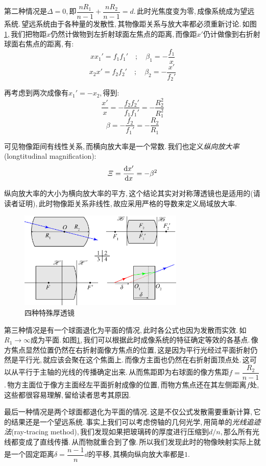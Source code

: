 第二种情况是\(\varDelta=0\),\,即\(\dfrac{nR_1}{n-1}+\dfrac{nR_2}{n-1}=d\).\,此时光焦度变为零,\,成像系统成为望远系统.\,望远系统由于各种量的发散性,\,其物像距关系与放大率都必须重新讨论.\,如图\ref{fig5-7-12},\,我们把物距\(x\)仍然计做物到左折射球面左焦点的距离,\,而像距\(x'\)仍计做像到右折射球面右焦点的距离,\,有:
\[xx_1'=f_1f_1'\quad ;\quad \beta_1=-\frac{f_1}{x}\]
\[x_2x'=f_2f_2'\quad ;\quad \beta_2=-\frac{x'}{f_2'}\]

再考虑到两次成像有\(x_1'=-x_2\),\,得到:
\[\frac{x'}{x}=-\frac{f_2f_2'}{f_1f_1'}=-\frac{R_2^2}{R_1^2}\]
\[\beta=-\frac{f_2}{f_1'}=-\frac{R_2}{R_1}\]

可见物像距间有线性关系,\,而横向放大率是一个常数.\,我们也定义\emph{纵向放大率}(longtitudinal magnification):
\[\varXi=\frac{\textrm{d} x'}{\textrm{d} x}=-\beta^2\]

纵向放大率的大小为横向放大率的平方,\,这个结论其实对对称薄透镜也是适用的(请读者证明),\,此时物像距关系非线性,\,故应采用严格的导数来定义局域放大率.

\begin{figure}[H]
\centering
\includegraphics[width=0.7\textwidth]{image/5-7-12.png}
\caption{四种特殊厚透镜}
\label{fig5-7-12}
\end{figure}

第三种情况是有一个球面退化为平面的情况,\,此时各公式也因为发散而实效.\,如\(R_1\to\infty\)成为平面.\,如图\ref{fig5-7-12},\,我们可以根据此时成像系统的特征确定等效的各基点.\,像方焦点显然位置仍然在右折射面像方焦点的位置,\,这是因为平行光经过平面折射仍然是平行光,\,就应该会聚在这个焦面上.\,而像方主面也仍然在右折射面顶点处.\,这可以从平行于主轴的光线的传播确定出来.\,从而焦距即为右球面的像方焦距\(f=\dfrac{R_2}{n-1}\).\,物方主面位于像方主面经左平面折射成像的位置,\,而物方焦点还在其左侧距离\(f\)处,\,这些都很容易理解,\,留给读者思考其原因.

最后一种情况是两个球面都退化为平面的情况.\,这是不仅公式发散需要重新计算,\,它的结果还是一个望远系统.\,事实上我们可以考虑傍轴的几何光学,\,用简单的\emph{光线追迹法}(ray-tracing method),\,我们发现如果把玻璃砖的厚度进行压缩到\(d/n\),\,那么所有光线都变成了直线传播.\,从而物就重合到了像.\,所以我们发现此时的物像映射实际上就是一个固定距离\(\delta=\dfrac{n-1}{n}d\)的平移,\,其横向纵向放大率都是\(1\).

